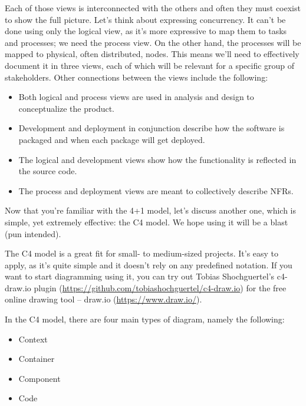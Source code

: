 Each of those views is interconnected with the others and often they must coexist to show the full picture. Let's think about expressing concurrency. It can't be done using only the logical view, as it's more expressive to map them to tasks and processes; we need the process view. On the other hand, the processes will be mapped to physical, often distributed, nodes. This means we'll need to effectively document it in three views, each of which will be relevant for a specific group of stakeholders. Other connections between the views include the following:

\begin{itemize}
\item
Both logical and process views are used in analysis and design to conceptualize the product.

\item 
Development and deployment in conjunction describe how the software is packaged and when each package will get deployed.

\item
The logical and development views show how the functionality is reflected in the source code.

\item
The process and deployment views are meant to collectively describe NFRs.
\end{itemize}

Now that you're familiar with the 4+1 model, let's discuss another one, which is simple, yet extremely effective: the C4 model. We hope using it will be a blast (pun intended).


The C4 model is a great fit for small- to medium-sized projects. It's easy to apply, as it's quite simple and it doesn't rely on any predefined notation. If you want to start diagramming using it, you can try out Tobias Shochguertel's c4-draw.io plugin (\url{https://github.com/tobiashochguertel/c4-draw.io}) for the free online drawing tool – draw.io (\url{https://www.draw.io/}).

In the C4 model, there are four main types of diagram, namely the following:


\begin{itemize}
\item
Context

\item 
Container

\item
Component

\item
Code
\end{itemize}

